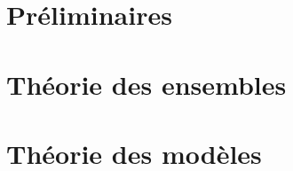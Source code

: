 \documentclass[11pt, a4paper, french]{book}
\begin{document}
	
	
	
	
	
	
	
	\mainmatter
	
	
	
	\part{Préliminaires}\label{part.preli}
	
	

	

        
        
        
        
        
        
        
        \part{Théorie des ensembles}\label{part.tde}
        
        
        
        
        
        
        
        
        
        
	
	
	\part{Théorie des modèles}\label{part.tdm}
	
	

        

        
\end{document}
